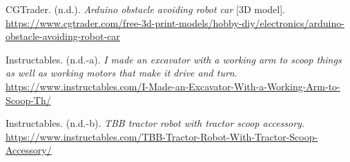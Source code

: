 \documentclass[12pt]{article}
\begin{document}
CGTrader. (n.d.). \textit{Arduino obstacle avoiding robot car} [3D model]. \url{https://www.cgtrader.com/free-3d-print-models/hobby-diy/electronics/arduino-obstacle-avoiding-robot-car}

Instructables. (n.d.-a). \textit{I made an excavator with a working arm to scoop things as well as working motors that make it drive and turn}. \url{https://www.instructables.com/I-Made-an-Excavator-With-a-Working-Arm-to-Scoop-Th/}

Instructables. (n.d.-b). \textit{TBB tractor robot with tractor scoop accessory}. \url{https://www.instructables.com/TBB-Tractor-Robot-With-Tractor-Scoop-Accessory/}
\end{document}

